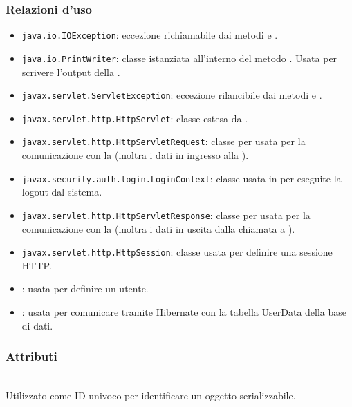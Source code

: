 \subsubsection*{Relazioni d'uso}
\begin{itemize}
	\item \texttt{java.io.IOException}: eccezione richiamabile dai metodi  e .
	\item \texttt{java.io.PrintWriter}: classe istanziata all'interno del metodo . Usata per scrivere l'output della .
	\item \texttt{javax.servlet.ServletException}: eccezione rilancibile dai metodi  e .
	\item \texttt{javax.servlet.http.HttpServlet}: classe estesa da .
	\item \texttt{javax.servlet.http.HttpServletRequest}:  classe per usata per la comunicazione con la  (inoltra i dati in ingresso alla ).
	\item \texttt{javax.security.auth.login.LoginContext}: classe usata in  per eseguite la logout dal sistema.
	\item \texttt{javax.servlet.http.HttpServletResponse}: classe per usata per la comunicazione con la  (inoltra i dati in uscita dalla chiamata a ).
	\item \texttt{javax.servlet.http.HttpSession}: classe usata per definire una sessione HTTP.
	\item {}: usata per definire un utente.
	\item {}: usata per comunicare tramite Hibernate con la tabella UserData della base di dati.
\end{itemize}

\subsubsection*{Attributi}
\begin{description}
  \item{}\\
  Utilizzato come ID univoco per identificare un oggetto serializzabile.
\end{description}

